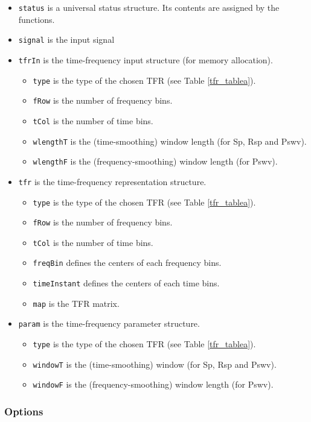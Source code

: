 \documentclass{article}
\begin{document}
\begin{itemize}
\item \texttt{status} is a universal status structure. Its contents are
assigned by the functions.
\item  \texttt{signal} is the input signal
\item \texttt{tfrIn} is the time-frequency input structure (for memory
allocation).
\begin{itemize}
\item \texttt{type} is the type of the chosen TFR (see Table \ref{tfr_tablea}).
\item \texttt{fRow} is the number of frequency bins.
\item \texttt{tCol} is the number of time bins.
\item \texttt{wlengthT} is the (time-smoothing) window length (for Sp,
Rsp and Pswv).
\item \texttt{wlengthF} is the (frequency-smoothing) window length (for Pswv).
\end{itemize}
\item \texttt{tfr} is the time-frequency representation structure.
\begin{itemize}
\item \texttt{type} is the type of the chosen TFR (see Table \ref{tfr_tablea}).
\item \texttt{fRow} is the number of frequency bins.
\item \texttt{tCol} is the number of time bins.
\item \texttt{freqBin} defines the centers of each frequency bins.
\item \texttt{timeInstant} defines the centers of each time bins.
\item \texttt{map} is the TFR matrix.
\end{itemize}
\item \texttt{param} is the time-frequency parameter structure.
\begin{itemize}
\item \texttt{type} is the type of the chosen TFR (see Table \ref{tfr_tablea}).
\item \texttt{windowT} is the (time-smoothing) window (for Sp,
Rsp and Pswv).
\item \texttt{windowF} is the (frequency-smoothing) window length (for
Pswv).
\end{itemize}
\end{itemize}

\subsubsection{Options}
\end{document}
